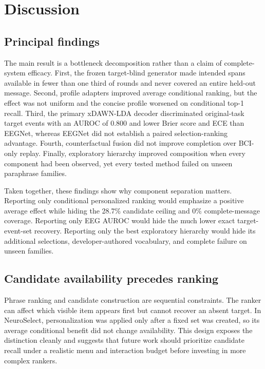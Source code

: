 \documentclass[11pt]{article}
\begin{document}
\section{Discussion}

\subsection{Principal findings}

The main result is a bottleneck decomposition rather than a claim of complete-system efficacy. First, the frozen target-blind generator made intended spans available in fewer than one third of rounds and never covered an entire held-out message. Second, profile adapters improved average conditional ranking, but the effect was not uniform and the concise profile worsened on conditional top-1 recall. Third, the primary xDAWN-LDA decoder discriminated original-task target events with an AUROC of 0.800 and lower Brier score and ECE than EEGNet, whereas EEGNet did not establish a paired selection-ranking advantage. Fourth, counterfactual fusion did not improve completion over BCI-only replay. Finally, exploratory hierarchy improved composition when every component had been observed, yet every tested method failed on unseen paraphrase families.


Taken together, these findings show why component separation matters. Reporting only conditional personalized ranking would emphasize a positive average effect while hiding the 28.7\% candidate ceiling and 0\% complete-message coverage. Reporting only EEG AUROC would hide the much lower exact target-event-set recovery. Reporting only the best exploratory hierarchy would hide its additional selections, developer-authored vocabulary, and complete failure on unseen families.


\subsection{Candidate availability precedes ranking}

Phrase ranking and candidate construction are sequential constraints. The ranker can affect which visible item appears first but cannot recover an absent target. In NeuroSelect, personalization was applied only after a fixed set was created, so its average conditional benefit did not change availability. This design exposes the distinction cleanly and suggests that future work should prioritize candidate recall under a realistic menu and interaction budget before investing in more complex rankers.
\end{document}
